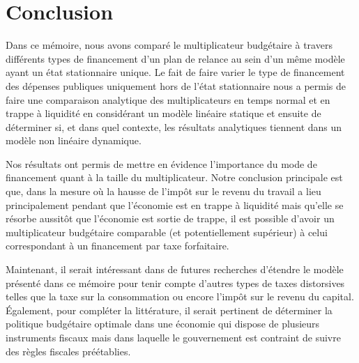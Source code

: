 \documentclass[12pt,letterpaper]{article}
\begin{document}
\section{Conclusion}

Dans ce mémoire, nous avons comparé le multiplicateur budgétaire à travers différents types de financement d’un plan de relance au sein d’un même modèle ayant un état stationnaire unique. Le fait de faire varier le type de financement des dépenses publiques uniquement hors de l’état stationnaire nous a permis de faire une comparaison analytique des multiplicateurs en temps normal et en trappe à liquidité en considérant un modèle linéaire statique et ensuite de déterminer si, et dans quel contexte, les résultats analytiques tiennent dans un modèle non linéaire dynamique.

Nos résultats ont permis de mettre en évidence l’importance du mode de financement quant à la taille du multiplicateur. Notre conclusion principale est que, dans la mesure où la hausse de l’impôt sur le revenu du travail a lieu principalement pendant que l’économie est en trappe à liquidité mais qu’elle se résorbe aussitôt que l’économie est sortie de trappe, il est possible d’avoir un multiplicateur budgétaire comparable (et potentiellement supérieur) à celui correspondant à un financement par taxe forfaitaire.

Maintenant, il serait intéressant dans de futures recherches d’étendre le modèle présenté dans ce mémoire pour tenir compte d’autres types de taxes distorsives telles que la taxe sur la consommation ou encore l’impôt sur le revenu du capital. Également, pour compléter la littérature, il serait pertinent de déterminer la politique budgétaire optimale dans une économie qui dispose de plusieurs instruments fiscaux mais dans laquelle le gouvernement est contraint de suivre des règles fiscales préétablies.

\newpage
\end{document}
